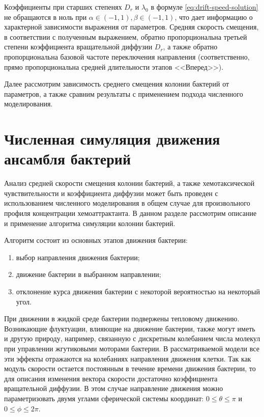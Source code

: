 Коэффициенты при старших степенях $D_r$ и $\lambda_0$ в формуле \cref{eq:drift-speed-solution} не обращаются в ноль при $\alpha \in (-1, 1), \beta \in (-1, 1)$, что дает информацию о характерной зависимости выражения от параметров. Средняя скорость смещения, в соответствии с полученным выражением, обратно пропорциональна третьей степени коэффициента вращательной диффузии $D_r$, а также обратно пропорциональна базовой частоте переключения направления (соответственно, прямо пропорциональна средней длительности этапов <<Вперед>>). 

Далее рассмотрим зависимость среднего смещения колонии бактерий от параметров, а также сравним результаты с применением подхода численного моделирования.

\section{Численная симуляция движения ансамбля бактерий}\label{sec:ch2/sec4}

Анализ средней скорости смещения колонии бактерий, а также хемотаксической чувствительности и коэффициента диффузии может быть проведен с использованием численного моделирования в общем случае для произвольного профиля концентрации хемоаттрактанта. В данном разделе рассмотрим описание и применение алгоритма симуляции колонии бактерий.

Алгоритм состоит из основных этапов движения бактерии: 
\begin{enumerate}
    \item выбор направления движения бактерии;
    \item движение бактерии в выбранном направлении;
    \item отклонение курса движения бактерии с некоторой вероятностью на некоторый угол.
\end{enumerate}

При движении в жидкой среде бактерии подвержены тепловому движению. Возникающие флуктуации, влияющие на движение бактерии, также могут иметь и другую природу, например, связанную с дискретным колебанием числа молекул при управлении жгутиковыми моторами бактерии. В рассматриваемой модели все эти эффекты отражаются на колебаниях направления движения клетки. Так как модуль скорости остается постоянным в течение времени движения бактерии, то для описания изменения вектора скорости достаточно коэффициента вращательной диффузии. В этом случае направление движения можно параметризовать двумя углами сферической системы координат: $0 \leq \theta \leq \pi$ и $0 \leq \phi \leq 2\pi$. 

